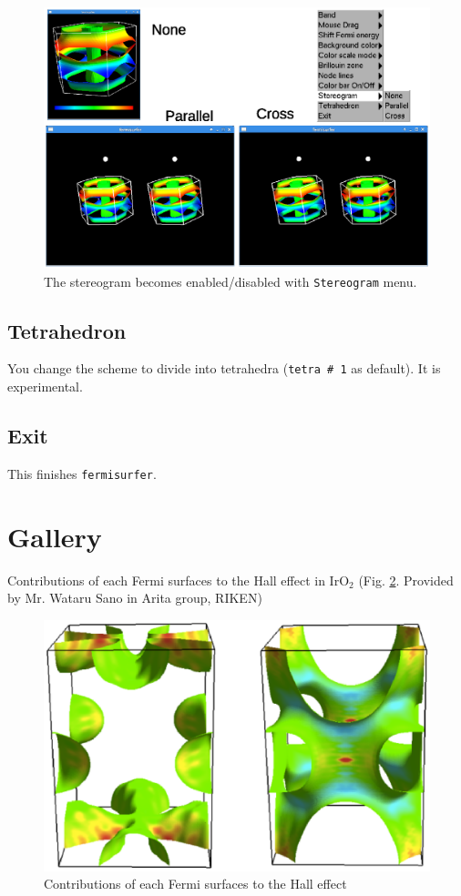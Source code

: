 \documentclass[12pt]{article}
\begin{document}
\begin{figure}[!ht]
  \includegraphics[width=17cm]{figs/stereogram.eps}
  \caption{The stereogram becomes enabled/disabled with \texttt{Stereogram} menu.}
  \label{fig_stereogram}
\end{figure}

\subsection{Tetrahedron}

You change the scheme to divide into tetrahedra (\texttt{tetra \# 1} as default).
It is experimental.

\subsection{Exit}

This finishes \verb|fermisurfer|.

\section{Gallery}

Contributions of each Fermi surfaces to the Hall effect
in IrO$_2$
(Fig. \ref{fig_iro2}. Provided by Mr. Wataru Sano in Arita group, RIKEN)

\begin{figure}[!ht]
  \includegraphics[width=17cm]{figs/iro2.eps}
  \caption{Contributions of each Fermi surfaces to the Hall effect}
  \label{fig_iro2}
\end{figure}
\end{document}
